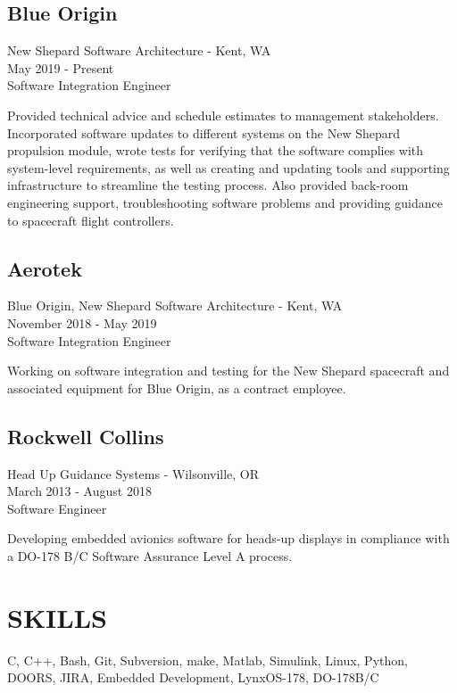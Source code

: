 \documentclass{article}
\newcommand{\skills}{C, C++,  Bash, Git, Subversion, make, Matlab, Simulink, Linux, Python, DOORS, JIRA, Embedded Development, LynxOS-178, DO-178B/C}
\newenvironment{job_desc}
    {
        \newline
        \begin{small}
    }
    {
        \end{small}
        \newline
    }
\begin{document}
    \begin{minipage}[t]{1\textwidth}

        \subsection*{Blue Origin}
            New Shepard Software Architecture - Kent, WA \\
            May 2019 - Present \\
            Software Integration Engineer\\
            \begin{job_desc}
            Provided technical advice and schedule estimates to management stakeholders.
            Incorporated software updates to different systems on the New Shepard propulsion module, wrote tests for
            verifying that the software complies with system-level requirements, as well as creating and updating tools and supporting
            infrastructure to streamline the testing process. Also provided back-room engineering support, troubleshooting software
            problems and providing guidance to spacecraft flight controllers.
            \end{job_desc}

        \subsection*{Aerotek}
            Blue Origin, New Shepard Software Architecture - Kent, WA \\
            November 2018 - May 2019 \\
            Software Integration Engineer\\
            \begin{job_desc}
                Working on software integration and testing for the New Shepard spacecraft and associated equipment for Blue Origin, as a contract employee.
            \end{job_desc}

        \subsection*{Rockwell Collins}
            Head Up Guidance Systems - Wilsonville, OR \\
            March 2013 - August 2018 \\
            Software Engineer\\
            \begin{job_desc}
            Developing embedded avionics software for heads-up displays in compliance with a DO-178 B/C Software Assurance Level A process.
            \end{job_desc}

    \end{minipage}


\section*{SKILLS}
        \skills


\vfill{}
\end{document}
